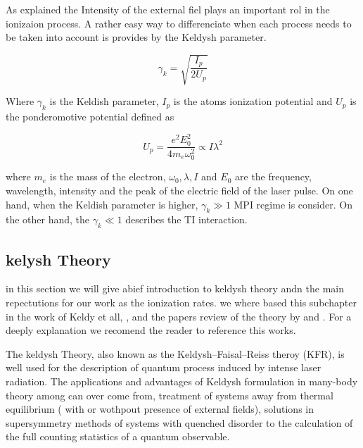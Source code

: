As explained the Intensity of the external fiel plays an important rol in the ionizaion process. A rather easy way to differenciate when each process needs to be taken into account is provides by the Keldysh parameter\cite{keldysh_ionization_1965}.

\begin{equation}
\gamma_{k}=\sqrt{\dfrac{I_{p}}{2U_{p}}}
\end{equation}

Where $\gamma_{k}$ is the Keldish parameter, $I_{p}$ is the atoms ionization potential and $U_{p}$ is the ponderomotive potential defined as

\begin{equation}
U_{p} = \dfrac{e^{2}E_{0}^{2}}{4m_{e}\omega_{0}^{2}} \propto I \lambda^{2}
\end{equation}

where $m_{e}$ is the mass of the electron, $\omega_{0}, \lambda, I$ and $E_{0}$ are the frequency, wavelength, intensity and the peak of the electric field of the laser pulse. On one hand, when the Keldish parameter is higher, $\gamma_{k} \gg 1$ MPI regime is consider. On the other hand, the $\gamma_{k} \ll 1$ describes the TI interaction.

\subsection{kelysh Theory}

in this section we will give abief introduction to keldysh theory andn the main repectutions for our work as the ionization rates. we where based this subchapter in the work of Keldy et all, \cite{keldysh_ionization_1965}, and the papers review of the theory by \cite{popruzhenko_keldysh_2014} and \cite{karnakov_strong_2009}. For a deeply explanation we recomend the reader to reference this works.

The keldysh Theory, also known as the Keldysh–Faisal–Reiss theroy (KFR),  is well used for the description of quantum process induced by intense laser radiation. The applications and advantages of Keldysh formulation in many-body theory among  can over come from, treatment of systems away from thermal equilibrium ( with or wothpout presence of external fields), solutions in  supersymmetry methods of systems with quenched disorder to the  calculation of the full counting statistics of a quantum observable\cite{kamenev_introduction_nodate}.

